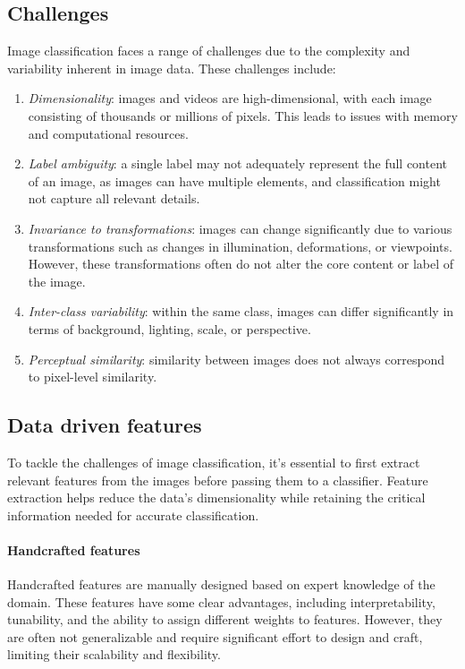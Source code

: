 \subsection{Challenges}
Image classification faces a range of challenges due to the complexity and variability inherent in image data. 
These challenges include:
\begin{enumerate}
    \item \textit{Dimensionality}: images and videos are high-dimensional, with each image consisting of thousands or millions of pixels. 
        This leads to issues with memory and computational resources.
    \item \textit{Label ambiguity}: a single label may not adequately represent the full content of an image, as images can have multiple elements, and classification might not capture all relevant details. 
    \item \textit{Invariance to transformations}: images can change significantly due to various transformations such as changes in illumination, deformations, or viewpoints. 
        However, these transformations often do not alter the core content or label of the image.
    \item \textit{Inter-class variability}: within the same class, images can differ significantly in terms of background, lighting, scale, or perspective. 
    \item \textit{Perceptual similarity}: similarity between images does not always correspond to pixel-level similarity.
\end{enumerate}

\subsection{Data driven features}
To tackle the challenges of image classification, it's essential to first extract relevant features from the images before passing them to a classifier. 
Feature extraction helps reduce the data's dimensionality while retaining the critical information needed for accurate classification.

\paragraph*{Handcrafted features}
Handcrafted features are manually designed based on expert knowledge of the domain. These features have some clear advantages, including interpretability, tunability, and the ability to assign different weights to features. 
However, they are often not generalizable and require significant effort to design and craft, limiting their scalability and flexibility.

